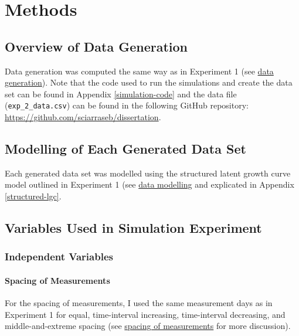 \documentclass[
12pt, %
twoside,
english]{guelphthesis}
\begin{document}
\hypertarget{methods-1}{%
\section{Methods}\label{methods-1}}

\hypertarget{overview-of-data-generation}{%
\subsection{Overview of Data Generation}\label{overview-of-data-generation}}

Data generation was computed the same way as in Experiment 1 (see \protect\hyperlink{data-generation}{data generation}). Note that the code used to run the simulations and create the data set can be found in Appendix \ref{simulation-code} and the data file (\texttt{exp\_2\_data.csv}) can be found in the following GitHub repository: \url{https://github.com/sciarraseb/dissertation}.

\hypertarget{data-modelling-exp2}{%
\subsection{Modelling of Each Generated Data Set}\label{data-modelling-exp2}}

Each generated data set was modelled using the structured latent growth curve model outlined in Experiment 1 (see \protect\hyperlink{data-modelling}{data modelling} and explicated in Appendix \ref{structured-lgc}.

\hypertarget{variables-used-in-simulation-experiment-1}{%
\subsection{Variables Used in Simulation Experiment}\label{variables-used-in-simulation-experiment-1}}

\hypertarget{independent-variables-1}{%
\subsubsection{Independent Variables}\label{independent-variables-1}}

\hypertarget{spacing-of-measurements-1}{%
\paragraph{Spacing of Measurements}\label{spacing-of-measurements-1}}

For the spacing of measurements, I used the same measurement days as in Experiment 1 for equal, time-interval increasing, time-interval decreasing, and middle-and-extreme spacing (see \protect\hyperlink{spacing-measurements}{spacing of measurements} for more discussion).
\end{document}
